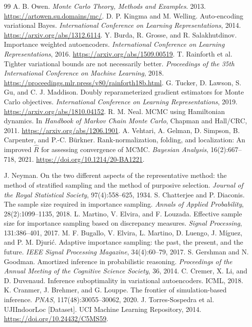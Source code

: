 \documentclass[10pt,letterpaper]{article}
\begin{document}
\begin{thebibliography}{99}
 A. B. Owen. \emph{Monte Carlo Theory, Methods and Examples}. 2013. \url{https://artowen.su.domains/mc/}.
 D. P. Kingma and M. Welling. Auto-encoding variational Bayes. \emph{International Conference on Learning Representations}, 2014. \url{https://arxiv.org/abs/1312.6114}.
 Y. Burda, R. Grosse, and R. Salakhutdinov. Importance weighted autoencoders. \emph{International Conference on Learning Representations}, 2016. \url{https://arxiv.org/abs/1509.00519}.
 T. Rainforth et al. Tighter variational bounds are not necessarily better. \emph{Proceedings of the 35th International Conference on Machine Learning}, 2018. \url{https://proceedings.mlr.press/v80/rainforth18b.html}.
 G. Tucker, D. Lawson, S. Gu, and C. J. Maddison. Doubly reparameterized gradient estimators for Monte Carlo objectives. \emph{International Conference on Learning Representations}, 2019. \url{https://arxiv.org/abs/1810.04152}.
 R. M. Neal. MCMC using Hamiltonian dynamics. In \emph{Handbook of Markov Chain Monte Carlo}, Chapman and Hall/CRC, 2011. \url{https://arxiv.org/abs/1206.1901}.
 A. Vehtari, A. Gelman, D. Simpson, B. Carpenter, and P.-C. B\"urkner. Rank-normalization, folding, and localization: An improved $\widehat R$ for assessing convergence of MCMC. \emph{Bayesian Analysis}, 16(2):667--718, 2021. \url{https://doi.org/10.1214/20-BA1221}.

 J. Neyman. On the two different aspects of the representative method: the method of stratified sampling and the method of purposive selection. \emph{Journal of the Royal Statistical Society}, 97(4):558--625, 1934.
 S. Chatterjee and P. Diaconis. The sample size required in importance sampling. \emph{Annals of Applied Probability}, 28(2):1099--1135, 2018.
 L. Martino, V. Elvira, and F. Louzada. Effective sample size for importance sampling based on discrepancy measures. \emph{Signal Processing}, 131:386--401, 2017.
 M. F. Bugallo, V. Elvira, L. Martino, D. Luengo, J. M\'iguez, and P. M. Djuri\'c. Adaptive importance sampling: the past, the present, and the future. \emph{IEEE Signal Processing Magazine}, 34(4):60--79, 2017.
 S. Gershman and N. Goodman. Amortized inference in probabilistic reasoning. \emph{Proceedings of the Annual Meeting of the Cognitive Science Society}, 36, 2014.
 C. Cremer, X. Li, and D. Duvenaud. Inference suboptimality in variational autoencoders. ICML, 2018.
 K. Cranmer, J. Brehmer, and G. Louppe. The frontier of simulation-based inference. \emph{PNAS}, 117(48):30055--30062, 2020.
 J. Torres-Sospedra et al. UJIIndoorLoc [Dataset]. UCI Machine Learning Repository, 2014. \url{https://doi.org/10.24432/C5MS59}.
\end{thebibliography}
\end{document}
